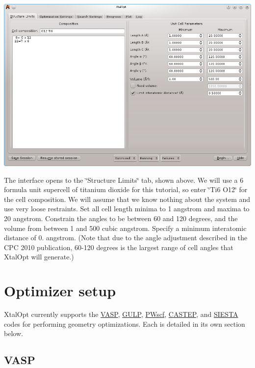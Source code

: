 \begin{DoxyImageNoCaption}
  \mbox{\includegraphics[width=\textwidth]{struct-lim.png}}
\end{DoxyImageNoCaption}


The interface opens to the \char`\"{}\+Structure Limits\char`\"{} tab, shown above. We will use a 6 formula unit supercell of titanium dioxide for this tutorial, so enter \char`\"{}\+Ti6 O12\char`\"{} for the cell composition. We will assume that we know nothing about the system and use very loose restraints. Set all cell length minima to 1 angstrom and maxima to 20 angstrom. Constrain the angles to be between 60 and 120 degrees, and the volume from between 1 and 500 cubic angstrom. Specify a minimum interatomic distance of 0. angstrom. (Note that due to the angle adjustment described in the C\+P\+C 2010 publication, 60-\/120 degrees is the largest range of cell angles that Xtal\+Opt will generate.)\hypertarget{tut-xo_opt}{}\section{Optimizer setup}\label{tut-xo_opt}
Xtal\+Opt currently supports the \hyperlink{tut-xo_vasp-opt}{V\+A\+S\+P}, \hyperlink{tut-xo_gulp-opt}{G\+U\+L\+P}, \hyperlink{tut-xo_pwscf-opt}{P\+Wscf}, \hyperlink{tut-xo_castep-opt}{C\+A\+S\+T\+E\+P}, and \hyperlink{tut-xo_siesta-opt}{S\+I\+E\+S\+T\+A} codes for performing geometry optimizations. Each is detailed in its own section below.\hypertarget{tut-xo_vasp-opt}{}\subsection{V\+A\+S\+P}\label{tut-xo_vasp-opt}
 
